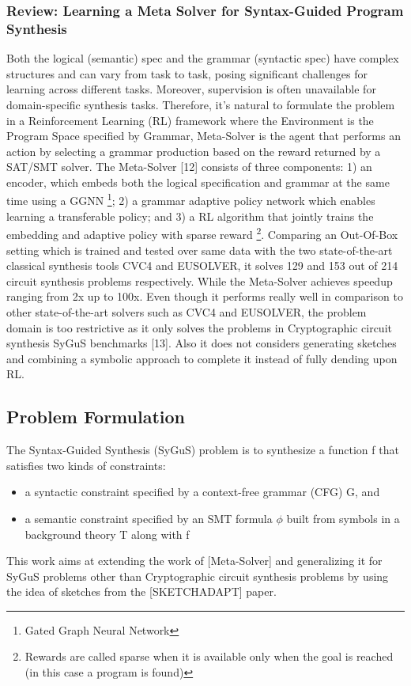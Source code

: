 \subsubsection{Review: Learning a Meta Solver for Syntax-Guided Program Synthesis}
Both the logical (semantic) spec and the grammar (syntactic spec) have complex structures and can vary from task to task, posing significant challenges for learning across different tasks. Moreover, supervision is often unavailable for domain-specific synthesis tasks. Therefore, it's natural to formulate the problem in a Reinforcement Learning (RL) framework where the Environment is the Program Space specified by Grammar, Meta-Solver is the agent that performs an action by selecting a grammar production based on the reward returned by a SAT/SMT solver. The Meta-Solver [12] consists of three components: 1) an encoder, which embeds both the logical specification and grammar at the same time using a GGNN \footnote{Gated Graph Neural Network}; 2) a grammar adaptive policy network which enables learning a transferable policy; and 3) a RL algorithm that jointly trains the embedding and adaptive policy with sparse reward \footnote{Rewards are called sparse when it is available only when the goal is reached (in this case a program is found)}. Comparing an Out-Of-Box setting which is trained and tested over same data with the two state-of-the-art classical synthesis tools CVC4 and EUSOLVER, it solves 129 and 153 out of 214 circuit synthesis problems respectively. While the Meta-Solver achieves speedup ranging from 2x up to 100x. Even though it performs really well in comparison to other state-of-the-art solvers such as CVC4 and EUSOLVER, the problem domain is too restrictive as it only solves the problems in Cryptographic circuit synthesis SyGuS benchmarks [13]. Also it does not considers generating sketches and combining a symbolic approach to complete it instead of fully dending upon RL.

\subsection{Problem Formulation}
\label{problem}
The Syntax-Guided Synthesis (SyGuS) problem is to synthesize a function f that satisfies two kinds of constraints:
\begin{itemize}
    \item a syntactic constraint specified by a context-free grammar (CFG) G, and
    \item a semantic constraint specified by an SMT formula $\phi$ built from symbols in a background theory T along with f
\end{itemize}
This work aims at extending the work of [Meta-Solver] and generalizing it for SyGuS problems other than Cryptographic circuit synthesis problems by using the idea of sketches from the [SKETCHADAPT] paper.

